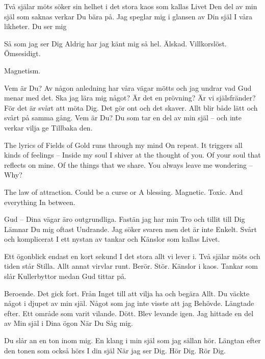 




\vfil\break

\startpoem
Två själar möts
söker sin helhet i det stora kaos
som kallas Livet
Den del av min själ
som saknas
verkar Du bära på. 
Jag speglar mig i glansen av
Din själ
I våra likheter.
Du ser mig

Så som jag ser Dig
Aldrig har jag känt mig så hel.
Älskad. Villkorslöst.
Ömsesidigt.

Magnetism.
\stoppoem

\startpoem
Vem är Du?
Av någon anledning har våra vägar mötts
och jag undrar vad Gud menar med det.
Ska jag lära mig något?
Är det en prövning?
Är vi själsfränder?
För det är svårt att möta Dig.
Det gör ont och det skaver.
Allt blir både lätt och svårt på 
samma gång.
Vem är Du? 
Du som tar en del av min själ – 
och inte verkar vilja ge 
Tillbaka den.
\stoppoem

\startpoem
The lyrics of Fields of Gold
runs through my mind 
On repeat.
It triggers all kinds of feelings – 
Inside my soul
I shiver at the thought of you.
Of your soul that reflects on mine.
Of the things that we share.
You always leave me
wondering –
Why?




The law of attraction.
Could be a curse or
A blessing.
Magnetic.
Toxic.
And everything 
In between.
\stoppoem

\startpoem
Gud – Dina vägar äro 
outgrundliga.
Fastän jag har min 
Tro och tillit till Dig
Lämnar Du mig oftast 
Undrande.
Jag söker svaren men det är inte
Enkelt.
Svårt och komplicerat
I ett nystan av tankar och 
Känslor 
som kallas
Livet.
\stoppoem

\startpoem
Ett ögonblick
endast en kort sekund
I det stora allt vi lever i.
Två själar möts
och tiden står
Stilla.
Allt annat virvlar runt.
Berör.
Stör.
Känslor i kaos.
Tankar som slår
Kullerbyttor
medan Gud tittar på.
\stoppoem

\startpoem
Beroende.
Det gick fort.
Från Inget till att vilja ha och begära
Allt.
Du väckte något i djupet av min själ.
Något som jag inte visste att jag 
Behövde.
Längtade efter.
Ett område som varit vilande.
Dött.
Blev levande igen.
Jag hittade en del av 
Min själ 
i Dina ögon
När Du 
Såg mig.
\stoppoem

\startpoem
Du slår an en ton inom mig.
En klang i min själ som jag
sällan hör.
Längtan efter den tonen som också hörs
I din själ
När jag ser Dig.
Hör Dig.
Rör Dig.


